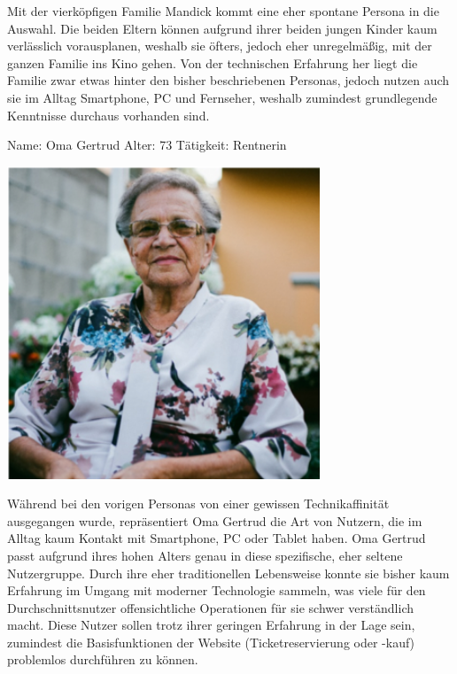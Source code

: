 Mit der vierköpfigen Familie Mandick kommt eine eher spontane Persona in die Auswahl.
Die beiden Eltern können aufgrund ihrer beiden jungen Kinder kaum verlässlich vorausplanen, weshalb sie öfters, jedoch eher unregelmäßig, mit der ganzen Familie ins Kino gehen.
Von der technischen Erfahrung her liegt die Familie zwar etwas hinter den bisher beschriebenen Personas, jedoch nutzen auch sie im Alltag Smartphone, PC und Fernseher, weshalb zumindest grundlegende Kenntnisse durchaus vorhanden sind.

\newpage
{}
\begin{minipage}[t]{0.5\textwidth} 	\vspace{0.0\baselineskip} %
	\begin{entrylist}
		\entry
		{Name:}
		{Oma Gertrud}
		\entry
		{Alter:}
		{73}
		\entry
		{Tätigkeit:}
		{Rentnerin}
	\end{entrylist}
	\begin{barchart}{5.0}\hspace{-1.5mm}
	\end{barchart}
\end{minipage}
\hfil
\begin{minipage}[t]{0.4\textwidth} 	\vspace{0.0\baselineskip} %
	\flushright
	\includegraphics[width=0.70\textwidth]{img/personas/oma_gertrud}
\end{minipage}

Während bei den vorigen Personas von einer gewissen Technikaffinität ausgegangen wurde, repräsentiert Oma Gertrud die Art von Nutzern, die im Alltag kaum Kontakt mit Smartphone, PC oder Tablet haben.
Oma Gertrud passt aufgrund ihres hohen Alters genau in diese spezifische, eher seltene Nutzergruppe.
Durch ihre eher traditionellen Lebensweise konnte sie bisher kaum Erfahrung im Umgang mit moderner Technologie sammeln, was viele für den Durchschnittsnutzer offensichtliche Operationen für sie schwer verständlich macht.
Diese Nutzer sollen trotz ihrer geringen Erfahrung in der Lage sein, zumindest die Basisfunktionen der Website (Ticketreservierung oder -kauf) problemlos durchführen zu können.